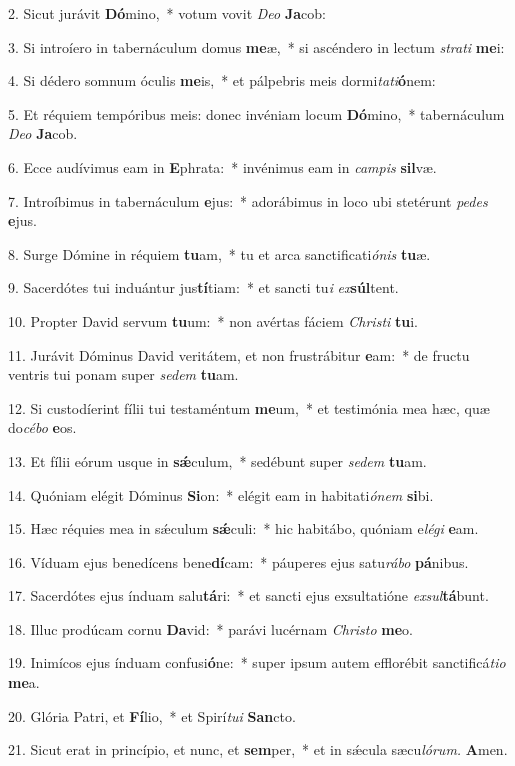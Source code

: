 \item 2. Sicut jurávit \textbf{Dó}mino,~* votum vovit \textit{Deo} \textbf{Ja}cob:
\item 3. Si introíero in tabernáculum domus \textbf{me}æ,~* si ascéndero in lectum \textit{strati} \textbf{me}i:
\item 4. Si dédero somnum óculis \textbf{me}is,~* et pálpebris meis dormi\textit{tati}\textbf{ó}nem:
\item 5. Et réquiem tempóribus meis: donec invéniam locum \textbf{Dó}mino,~* tabernáculum \textit{Deo} \textbf{Ja}cob.
\item 6. Ecce audívimus eam in \textbf{E}phrata:~* invénimus eam in \textit{campis} \textbf{sil}væ.
\item 7. Introíbimus in tabernáculum \textbf{e}jus:~* adorábimus in loco ubi stetérunt \textit{pedes} \textbf{e}jus.
\item 8. Surge Dómine in réquiem \textbf{tu}am,~* tu et arca san\-ctificati\textit{ónis} \textbf{tu}æ.
\item 9. Sacerdótes tui induántur jus\textbf{tí}tiam:~* et sancti tu\textit{i} \textit{ex}\textbf{súl}tent.
\item 10. Propter David servum \textbf{tu}um:~* non avértas fáciem \textit{Christi} \textbf{tu}i.
\item 11. Jurávit Dóminus David veritátem, et non frustrábitur \textbf{e}am:~* de fru\-ctu ventris tui ponam super \textit{sedem} \textbf{tu}am.
\item 12. Si custodíerint fílii tui testaméntum \textbf{me}um,~* et testimónia mea hæc, quæ do\textit{cébo} \textbf{e}os.
\item 13. Et fílii eórum usque in \textbf{sǽ}culum,~* sedébunt super \textit{sedem} \textbf{tu}am.
\item 14. Quóniam elégit Dóminus \textbf{Si}on:~* elégit eam in habitati\textit{ónem} \textbf{si}bi.
\item 15. Hæc réquies mea in sǽculum \textbf{sǽ}culi:~* hic habitábo, quóniam e\textit{légi} \textbf{e}am.
\item 16. Víduam ejus benedícens bene\textbf{dí}cam:~* páuperes ejus satu\textit{rábo} \textbf{pá}nibus.
\item 17. Sacerdótes ejus índuam salu\textbf{tá}ri:~* et sancti ejus exsultatióne \textit{exsul}\textbf{tá}bunt.
\item 18. Illuc prodúcam cornu \textbf{Da}vid:~* parávi lucérnam \textit{Christo} \textbf{me}o.
\item 19. Inimícos ejus índuam confusi\textbf{ó}ne:~* super ipsum autem efflorébit sanctificá\textit{tio} \textbf{me}a.
\item 20. Glória Patri, et \textbf{Fí}lio,~* et Spirí\textit{tui} \textbf{San}cto.
\item 21. Sicut erat in princípio, et nunc, et \textbf{sem}per,~* et in sǽcula sæcu\hspace{0.03em}\textit{lórum.} \textbf{A}men.
